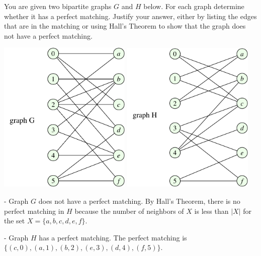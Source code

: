 \documentclass{article}
\begin{document}
\begin{problem}
	You are given two bipartite graphs $G$ and $H$ below. For each
	graph determine whether it has a perfect matching.
	Justify your answer, either by 
	listing the edges that are in the matching or using
	Hall's Theorem to show that the graph does not have a
	perfect matching.

\vskip 0.25in

	\begin{center}
	\includegraphics[width = 2.5in]{bipartite_graphG_hw5.pdf}
	\quad\quad
	\includegraphics[width = 2.5in]{bipartite_graphH_hw5.pdf}
	\quad\quad\ 
	\hfill\ 
	\end{center}

\vskip 0.25in

\vspace{0.1in} - Graph $G$ does not have a perfect matching. By Hall's Theorem, there is no perfect matching in $H$ because the number of neighbors of $X$ is less than $|X|$ for the set $X = \{a, b, c, d,e,f\}$.

\vspace{0.1in} - Graph $H$ has a perfect matching. The perfect matching is $\{(c,0), (a, 1), (b, 2), (e, 3), (d, 4), (f,5)\}$.

\end{problem}
\end{document}
